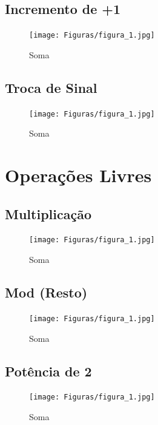 \documentclass[a4paper, 12pt]{article}
\begin{document}
\subsection{Incremento de +1}

\begin{figure}[h]
\caption{Soma}

\centering
\texttt{[image: Figuras/figura\_1.jpg]}
\label{figura:qualquernome}
\end{figure}

\subsection{Troca de Sinal}

\begin{figure}[h]
\caption{Soma}

\centering
\texttt{[image: Figuras/figura\_1.jpg]}
\label{figura:qualquernome}
\end{figure}


\section{Operações Livres}

\subsection{Multiplicação}

\begin{figure}[h]
\caption{Soma}

\centering
\texttt{[image: Figuras/figura\_1.jpg]}
\label{figura:qualquernome}
\end{figure}

\subsection{Mod (Resto)}

\begin{figure}[h]
\caption{Soma}

\centering
\texttt{[image: Figuras/figura\_1.jpg]}
\label{figura:qualquernome}
\end{figure}

\subsection{Potência de 2}

\begin{figure}[h]
\caption{Soma}

\centering
\texttt{[image: Figuras/figura\_1.jpg]}
\label{figura:qualquernome}
\end{figure}
\end{document}
